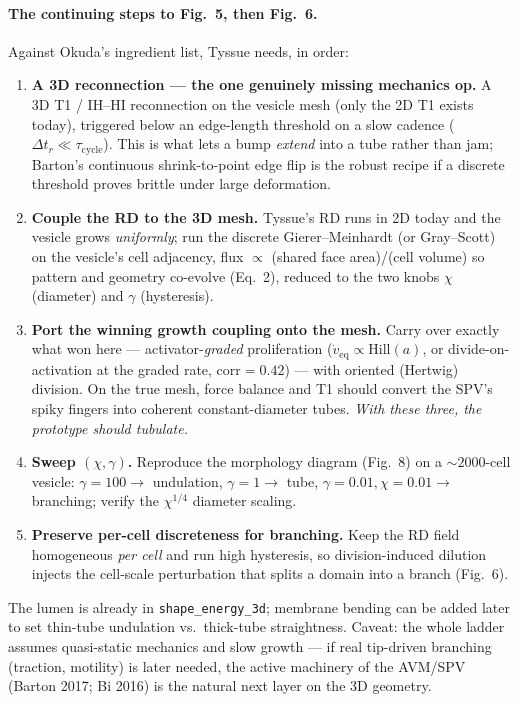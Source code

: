 \documentclass[11pt]{article}
\begin{document}
\paragraph{The continuing steps to Fig.~5, then Fig.~6.} Against Okuda's ingredient list, Tyssue needs,
in order:
\begin{enumerate}\itemsep1pt
\item \textbf{A 3D reconnection --- the one genuinely missing mechanics op.} A 3D T1 / IH--HI reconnection
on the vesicle mesh (only the 2D T1 exists today), triggered below an edge-length threshold on a slow
cadence ($\Delta t_r\!\ll\!\tau_{\text{cycle}}$). This is what lets a bump \emph{extend} into a tube rather
than jam; Barton's continuous shrink-to-point edge flip is the robust recipe if a discrete threshold
proves brittle under large deformation.
\item \textbf{Couple the RD to the 3D mesh.} Tyssue's RD runs in 2D today and the vesicle grows
\emph{uniformly}; run the discrete Gierer--Meinhardt (or Gray--Scott) on the vesicle's cell adjacency,
flux $\propto$ (shared face area)/(cell volume) so pattern and geometry co-evolve (Eq.~2), reduced to the
two knobs $\chi$ (diameter) and $\gamma$ (hysteresis).
\item \textbf{Port the winning growth coupling onto the mesh.} Carry over exactly what won here ---
activator-\emph{graded} proliferation ($\dot v_{\text{eq}}\!\propto\!\mathrm{Hill}(a)$, or divide-on-activation
at the graded rate, $\mathrm{corr}\!=\!0.42$) --- with oriented (Hertwig) division. On the true mesh,
force balance and T1 should convert the SPV's spiky fingers into coherent constant-diameter tubes.
\emph{With these three, the prototype should tubulate.}
\item \textbf{Sweep $(\chi,\gamma)$.} Reproduce the morphology diagram (Fig.~8) on a $\sim\!2000$-cell
vesicle: $\gamma\!=\!100\to$ undulation, $\gamma\!=\!1\to$ tube, $\gamma\!=\!0.01,\chi\!=\!0.01\to$
branching; verify the $\chi^{1/4}$ diameter scaling.
\item \textbf{Preserve per-cell discreteness for branching.} Keep the RD field homogeneous \emph{per cell}
and run high hysteresis, so division-induced dilution injects the cell-scale perturbation that splits a
domain into a branch (Fig.~6).
\end{enumerate}
The lumen is already in \texttt{shape\_energy\_3d}; membrane bending can be added later to set thin-tube
undulation vs.\ thick-tube straightness. Caveat: the whole ladder assumes quasi-static mechanics and slow
growth --- if real tip-driven branching (traction, motility) is later needed, the active machinery of the
AVM/SPV (Barton 2017; Bi 2016) is the natural next layer on the 3D geometry.
\end{document}

